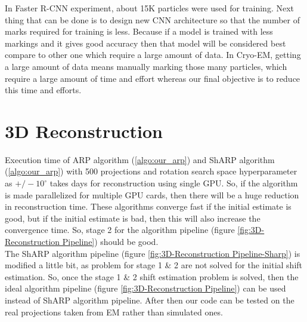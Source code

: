 \documentclass[twoside]{iitbreport}
\begin{document}
In Faster R-CNN experiment, about 15K particles were used for training. Next thing that can be done is to design new CNN architecture so that the number of marks required for training is less. Because if a model is trained with less markings and it gives good accuracy then that model will be considered best compare to other one which require a large amount of data. In Cryo-EM, getting a large amount of data means manually marking those many particles, which require a large amount of time and effort whereas our final objective is to reduce this time and efforts.\\


\section{3D Reconstruction}

Execution time of ARP algorithm (\ref{algo:our_arp}) and ShARP algorithm (\ref{algo:our_arp}) with 500 projections and rotation search space hyperparameter as $+/- 10^{\circ}$ takes days for reconstruction using single GPU. So, if the algorithm is made parallelized for multiple GPU cards, then there will be a huge reduction in reconstruction time. These algorithms converge fast if the initial estimate is good, but if the initial estimate is bad, then this will also increase the convergence time. So, stage 2 for the algorithm pipeline (figure \ref{fig:3D-Reconstruction Pipeline}) should be good. \\

The ShARP algorithm pipeline (figure \ref{fig:3D-Reconstruction Pipeline-Sharp}) is modified a little bit, as problem for stage 1 \&  2 are not solved for the initial shift estimation. So, once the stage 1 \&  2 shift estimation problem is solved, then the ideal algorithm pipeline (figure \ref{fig:3D-Reconstruction Pipeline}) can be used instead of  ShARP algorithm pipeline. After then our code can be tested on the real projections taken from EM rather than simulated ones.\\
\end{document}

